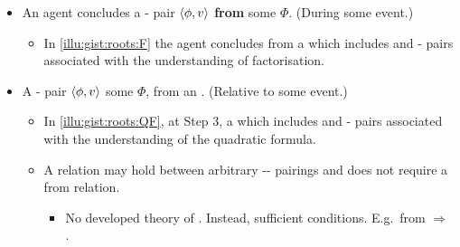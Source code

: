 \documentclass[10pt]{article}
\newcommand{\squareBullet}{\textcolor{black}{\raisebox{.45ex}{\rule{.6ex}{.6ex}}}}
\newcommand{\hand}{\ding{43}}
\begin{document}
\begin{note}
  \begin{itemize}[label = \squareBullet]
  \item
    An agent concludes a - pair \(\langle\phi, v\rangle\) \textbf{from} some \pool{} \(\Phi\). \hfill (During some event.)
    \begin{itemize}
    \item
      In \autoref{illu:gist:roots:F} the agent concludes  from a \pool{} which includes  and - pairs associated with the \agents{} understanding of factorisation.
    \end{itemize}
  \item
    A - pair \(\langle\phi, v\rangle\) \textbf{\fof{}} some \pool{} \(\Phi\), from an \agpe{}. \hfill (Relative to some event.)
    \begin{itemize}
    \item
      In \autoref{illu:gist:roots:QF}, at Step 3,  \fof{} a \pool{} which includes  and - pairs associated with the \agents{} understanding of the quadratic formula.
    \end{itemize}
    \begin{itemize}
    \item[\hand]
      A \fof{} relation may hold between arbitrary -- pairings and does not require a from relation.
      \begin{itemize}
      \item
        No developed theory of .
        Instead, sufficient conditions.
        E.g.\ from \(\Rightarrow\) \fof{}.
      \end{itemize}
    \end{itemize}
  \end{itemize}
\end{note}

\begin{comment}
  Relative to an \eiw{} agent concludes.

  E.g.\ agent concluded by factorisation, but had the option to use the quadratic formula.

  For additional examples, consider practice problems.
  If you've been learning the basics of factorisation, then \fofr{} should (hopefully) hold for practice problems.
\end{comment}
\end{document}
